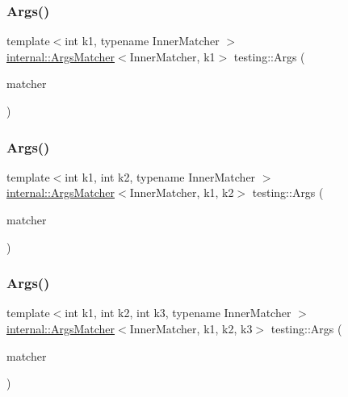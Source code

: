 \mbox{\label{namespacetesting_af67bac6da407df7586f60cfa2c9b602d}} 
\subsubsection{\texorpdfstring{Args()}{Args()}\hspace{0.1cm}{\footnotesize\ttfamily [2/11]}}
{\footnotesize\ttfamily template$<$int k1, typename Inner\+Matcher $>$ \\
\hyperlink{classtesting_1_1internal_1_1_args_matcher}{internal\+::\+Args\+Matcher}$<$Inner\+Matcher, k1$>$ testing\+::\+Args (\begin{DoxyParamCaption}\item[{const Inner\+Matcher \&}]{matcher }\end{DoxyParamCaption})\hspace{0.3cm}{\ttfamily [inline]}}

\mbox{\label{namespacetesting_a663409e441584c81f496e9c98fd3453c}} 
\subsubsection{\texorpdfstring{Args()}{Args()}\hspace{0.1cm}{\footnotesize\ttfamily [3/11]}}
{\footnotesize\ttfamily template$<$int k1, int k2, typename Inner\+Matcher $>$ \\
\hyperlink{classtesting_1_1internal_1_1_args_matcher}{internal\+::\+Args\+Matcher}$<$Inner\+Matcher, k1, k2$>$ testing\+::\+Args (\begin{DoxyParamCaption}\item[{const Inner\+Matcher \&}]{matcher }\end{DoxyParamCaption})\hspace{0.3cm}{\ttfamily [inline]}}

\mbox{\label{namespacetesting_abd3ddae153e1c452b7625808cc4d820b}} 
\subsubsection{\texorpdfstring{Args()}{Args()}\hspace{0.1cm}{\footnotesize\ttfamily [4/11]}}
{\footnotesize\ttfamily template$<$int k1, int k2, int k3, typename Inner\+Matcher $>$ \\
\hyperlink{classtesting_1_1internal_1_1_args_matcher}{internal\+::\+Args\+Matcher}$<$Inner\+Matcher, k1, k2, k3$>$ testing\+::\+Args (\begin{DoxyParamCaption}\item[{const Inner\+Matcher \&}]{matcher }\end{DoxyParamCaption})\hspace{0.3cm}{\ttfamily [inline]}}

